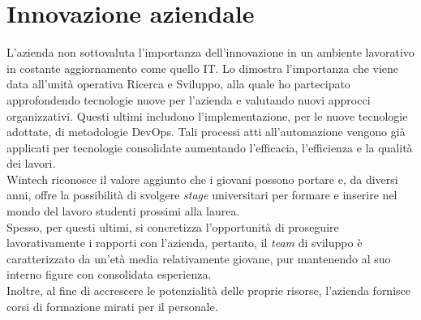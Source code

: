 \section{Innovazione aziendale}
L'azienda non sottovaluta l'importanza dell'innovazione in un ambiente lavorativo in costante aggiornamento come quello \gls{IT}. Lo dimostra l'importanza che viene data all'unità operativa Ricerca e Sviluppo, alla quale ho partecipato approfondendo tecnologie nuove per l'azienda e valutando nuovi approcci organizzativi. Questi ultimi includono l'implementazione, per le nuove tecnologie adottate, di metodologie \gls{DevOps}. Tali processi atti all'automazione vengono già applicati per tecnologie consolidate aumentando l'efficacia, l'efficienza e la qualità dei lavori.\\
Wintech riconosce il valore aggiunto che i giovani possono portare e, da diversi anni, offre la possibilità di svolgere \emph{stage} universitari per formare e inserire nel mondo del lavoro studenti prossimi alla laurea.\\
Spesso, per questi ultimi, si concretizza l'opportunità di proseguire lavorativamente i rapporti con l'azienda, pertanto, il \emph{team} di sviluppo è caratterizzato da un'età media relativamente giovane, pur mantenendo al suo interno figure con consolidata esperienza.\\ 
Inoltre, al fine di accrescere le potenzialità delle proprie risorse, l'azienda fornisce corsi di formazione mirati per il personale.
